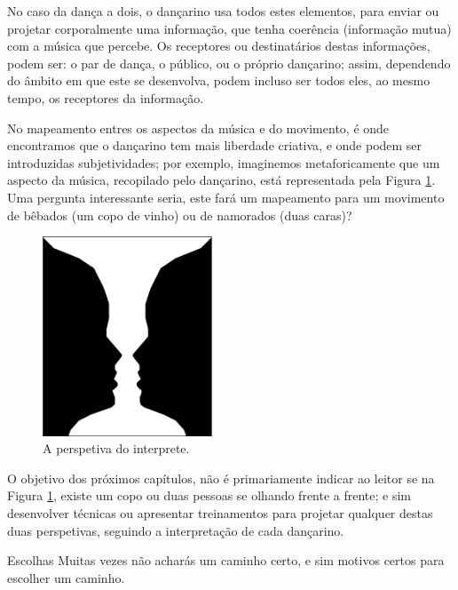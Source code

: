 No caso da dança a dois, o dançarino usa todos estes elementos, 
para enviar ou projetar corporalmente uma informação, que tenha coerência (informação mutua) com a música que percebe.
Os receptores ou destinatários destas informações, podem ser: o par de dança,
o público, ou o próprio dançarino; 
assim, dependendo do âmbito em que este se desenvolva,
podem incluso ser todos eles, ao mesmo tempo, os receptores da informação.

No mapeamento entres os aspectos da música e do movimento, 
é onde encontramos que o dançarino tem mais liberdade criativa, 
e onde podem ser introduzidas subjetividades; por exemplo,
imaginemos metaforicamente que um aspecto da música, recopilado pelo dançarino, 
está representada pela Figura \ref{fig:LaCopaDeRubin}.
Uma pergunta interessante seria, 
este fará um mapeamento para um  movimento de bêbados (um copo de vinho) ou de namorados (duas caras)?
\begin{figure}[!h]
  \centering
    \includegraphics[width=0.45\textwidth]{chapters/cap-musicalidade/LaCopaDeRubin.eps}
\caption{A perspetiva do interprete.}
\label{fig:LaCopaDeRubin}
\end{figure}

O objetivo dos próximos  capítulos, não é primariamente indicar ao leitor se na Figura \ref{fig:LaCopaDeRubin},
existe um copo ou duas pessoas se olhando frente a frente; e sim desenvolver técnicas ou 
apresentar treinamentos para projetar qualquer destas duas perspetivas, seguindo a interpretação de cada dançarino.

\begin{FraseFernandoPR}{Escolhas}
Muitas vezes não acharás um caminho certo, 
e sim motivos certos para escolher um caminho.%
\end{FraseFernandoPR}

